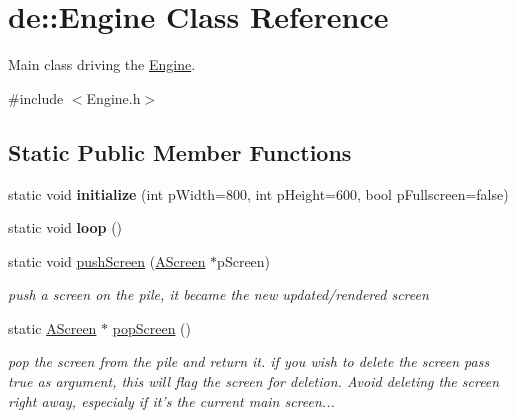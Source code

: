 \hypertarget{classde_1_1_engine}{
\section{de\-:\-:\-Engine \-Class \-Reference}
\label{classde_1_1_engine}
}


\-Main class driving the \hyperlink{classde_1_1_engine}{\-Engine}.  




{\ttfamily \#include $<$\-Engine.\-h$>$}

\subsection*{\-Static \-Public \-Member \-Functions}
\begin{DoxyCompactItemize}
\item 
\hypertarget{classde_1_1_engine_ac4c2011633fe02a8d501b4a44c24d9c6}{
static void {\bfseries initialize} (int p\-Width=800, int p\-Height=600, bool p\-Fullscreen=false)}
\label{classde_1_1_engine_ac4c2011633fe02a8d501b4a44c24d9c6}

\item 
\hypertarget{classde_1_1_engine_afe7222c75b761a87e97755b25012a155}{
static void {\bfseries loop} ()}
\label{classde_1_1_engine_afe7222c75b761a87e97755b25012a155}

\item 
\hypertarget{classde_1_1_engine_a560c70eb0a07fc209672ebd0be8b3bc6}{
static void \hyperlink{classde_1_1_engine_a560c70eb0a07fc209672ebd0be8b3bc6}{push\-Screen} (\hyperlink{classde_1_1_a_screen}{\-A\-Screen} $\ast$p\-Screen)}
\label{classde_1_1_engine_a560c70eb0a07fc209672ebd0be8b3bc6}

\begin{DoxyCompactList}\small\item\em push a screen on the pile, it became the new updated/rendered screen \end{DoxyCompactList}\item 
\hypertarget{classde_1_1_engine_a52230fb1aedeef894a1e5adfe0923d57}{
static \hyperlink{classde_1_1_a_screen}{\-A\-Screen} $\ast$ \hyperlink{classde_1_1_engine_a52230fb1aedeef894a1e5adfe0923d57}{pop\-Screen} ()}
\label{classde_1_1_engine_a52230fb1aedeef894a1e5adfe0923d57}

\begin{DoxyCompactList}\small\item\em pop the screen from the pile and return it. if you wish to delete the screen pass true as argument, this will flag the screen for deletion. \-Avoid deleting the screen right away, especialy if it's the current main screen... \end{DoxyCompactList}\end{DoxyCompactItemize}
